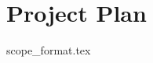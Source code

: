 \documentclass{article}
\begin{document}

\section*{Project Plan}
{scope_format.tex}





\end{document}
